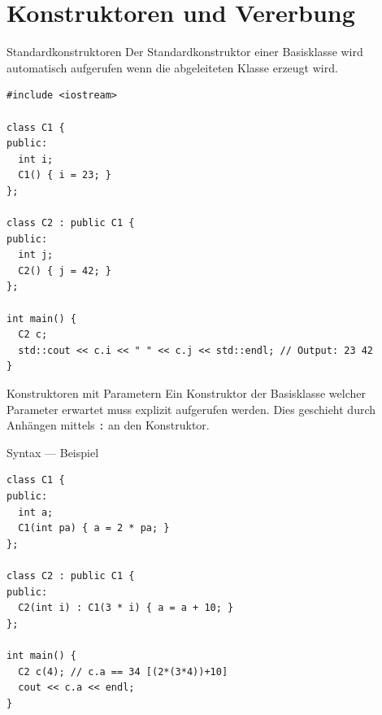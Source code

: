 \documentclass[presentation]{beamer}
\begin{document}
\section{Konstruktoren und Vererbung}
\label{sec:orgc59d5cd}
\begin{frame}[label={sec:org25258d2},fragile]{Standardkonstruktoren}
 Der Standardkonstruktor einer Basisklasse wird automatisch aufgerufen
wenn die abgeleiteten Klasse erzeugt wird.
\begin{verbatim}
#include <iostream>

class C1 {
public:
  int i;
  C1() { i = 23; }
};

class C2 : public C1 {
public:
  int j;
  C2() { j = 42; }
};

int main() {
  C2 c;
  std::cout << c.i << " " << c.j << std::endl; // Output: 23 42
}
\end{verbatim}
\end{frame}
\begin{frame}[label={sec:orged95922},fragile]{Konstruktoren mit Parametern}
 Ein Konstruktor der Basisklasse welcher Parameter erwartet \alert{muss
explizit aufgerufen werden}. Dies geschieht durch Anhängen mittels {\color{solarizedYellow}\verb!:!}
an den Konstruktor.
\begin{exampleblock}{Syntax --- Beispiel}
\begin{verbatim}
class C1 {
public:
  int a;
  C1(int pa) { a = 2 * pa; }
};

class C2 : public C1 {
public:
  C2(int i) : C1(3 * i) { a = a + 10; }
};

int main() {
  C2 c(4); // c.a == 34 [(2*(3*4))+10]
  cout << c.a << endl;
}
\end{verbatim}
\end{exampleblock}
\end{frame}
\end{document}
